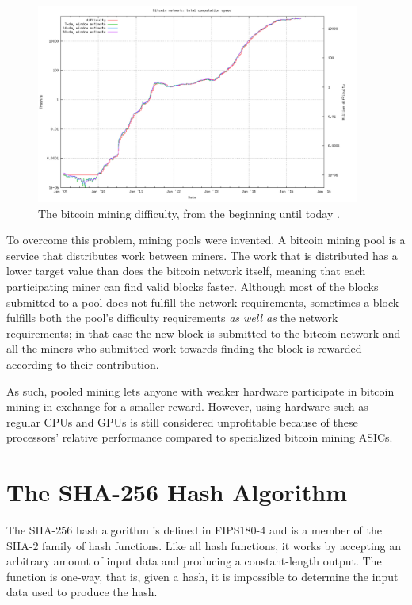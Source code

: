 \begin{figure}[htb]
    \centering
    \includegraphics[width=0.95\textwidth]{Figures/Bitcoin/Difficulty-all}
    \caption{The bitcoin mining difficulty, from the beginning until today \cite{bitcoin-charts}.}
    \label{fig:difficulty}
\end{figure}

To overcome this problem, mining pools were invented. A bitcoin mining pool is a service that distributes
work between miners. The work that is distributed has a lower target value than does the bitcoin network
itself, meaning that each participating miner can find valid blocks faster. Although most of the blocks
submitted to a pool does not fulfill the network requirements, sometimes a block fulfills both the
pool's difficulty requirements \emph{as well as} the network requirements; in that case the new block is
submitted to the bitcoin network and all the miners who submitted work towards finding the block
is rewarded according to their contribution.

As such, pooled mining lets anyone with weaker hardware participate in bitcoin mining in exchange for
a smaller reward. However, using hardware such as regular CPUs and GPUs is still considered unprofitable
because of these processors' relative performance compared to specialized bitcoin mining ASICs.

\section{The SHA-256 Hash Algorithm}

The SHA-256 hash algorithm is defined in FIPS180-4 \cite{fips180-4} and is a member of the SHA-2
family of hash functions. Like all hash functions, it works by accepting an arbitrary
amount of input data and producing a constant-length output. The function is one-way,
that is, given a hash, it is impossible to determine the input data used to produce
the hash.

